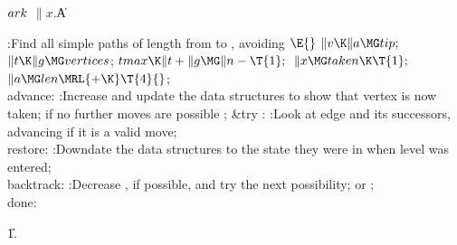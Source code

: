 \Y\B\4\D$\\{ark}$ \5
$\|x.{}$\|A\par
\Y\B\4:Find all simple paths of length  from  to , avoiding \X${}\E{}$\6
$\|v\K\|a\MG\\{tip};{}$\6
${}\|t\K\|g\MG\\{vertices}{}$;\5
${}\\{tmax}\K\|t+\|g\MG\|n-\T{1};{}$\6
${}\|x\MG\\{taken}\K\T{1};{}$\6
${}\|a\MG\\{len}\MRL{+{\K}}\T{4}{}$;\6
\4\\{advance}:\5
:Increase  and update the data structures to show that vertex  is now taken;  if no further moves are possible%
\X;\6
\&{try} : :Look at edge  and its successors, advancing if it is a
valid move\X;\6
\4\\{restore}:\5
:Downdate the data structures to the state they were in when level 
was entered\X;\6
\4\\{backtrack}:\5
:Decrease , if possible, and try the next possibility; or \X;\6
\\{done}:\par
\U1.\fi

